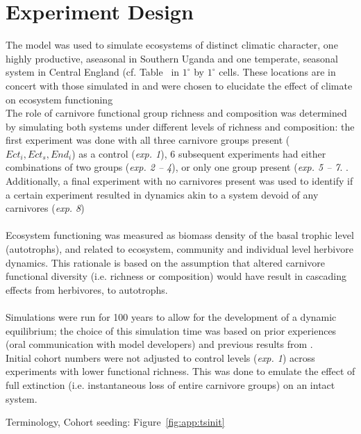 \section{Experiment Design}
\label{chap:mat:exp}
The model was used to simulate ecosystems of distinct climatic character, one highly productive, aseasonal in Southern Uganda and one temperate, seasonal system in Central England (cf. Table~ in $1^\circ$ by $1^\circ$ cells. 
These locations are in concert with those simulated in \citet{Harfoot2014} and were chosen to elucidate the effect of climate on ecosystem functioning
\\ The role of carnivore functional group richness and composition was determined by simulating both systems under different levels of richness and composition: 
the first experiment was done with all three carnivore groups present ($Ect_i, Ect_s, End_i$) as a control (\textit{exp. 1}), 6 subsequent experiments had either combinations of two groups (\textit{exp. 2 -- 4}), or only one group present (\textit{exp. 5 -- 7}. .
Additionally, a final experiment with no carnivores present was used to identify if a certain experiment resulted in dynamics akin to a system devoid of any carnivores (\textit{exp. 8})\\\\
Ecosystem functioning was measured as biomass density of the basal trophic level (autotrophs), and related to ecosystem, community and individual level herbivore dynamics. This rationale is based on the assumption that altered carnivore functional diversity (i.e. richness or composition) would have result in cascading effects from herbivores, to autotrophs. \\\\
Simulations were run for 100 years to allow for the development of a dynamic equilibrium; 
the choice of this simulation time was based on prior experiences (oral communication with model developers) and previous results from \cite{Harfoot2014}. \\
Initial cohort numbers were not adjusted to control levels (\textit{exp. 1}) across experiments with lower functional richness. This was done to emulate the effect of full extinction (i.e. instantaneous loss of entire carnivore groups) on an intact system.

Terminology, Cohort seeding: Figure~\ref{fig:app:tsinit}
%

